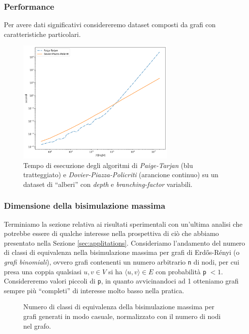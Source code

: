 \subsubsection{Performance}
Per avere dati significativi considereremo dataset composti da grafi con caratteristiche particolari.
\begin{figure}
    \centering
    \includegraphics[width=0.7\textwidth]{./sezione3/experimental_results/plots/tree.png}
    \caption{Tempo di esecuzione degli algoritmi di \emph{Paige-Tarjan} (blu tratteggiato) e \emph{Dovier-Piazza-Policriti} (arancione continuo) su un dataset di ``alberi'' con \emph{depth} e \emph{branching-factor} variabili.}
    \label{fig:tree_exp_result}
\end{figure}

\subsubsection{Dimensione della bisimulazione massima}
Terminiamo la sezione relativa ai risultati sperimentali con un'ultima analisi che potrebbe essere di qualche interesse nella prospettiva di ciò che abbiamo presentato nella Sezione \ref{sec:applitations}. Consideriamo l'andamento del numero di classi di equivalenza nella bisimulazione massima per grafi di Erdős-Rényi (o \emph{grafi binomiali}), ovvero grafi contenenti un numero arbitrario \verb|n| di nodi, per cui presa una coppia qualsiasi $u,v \in V$ si ha $\langle u,v\rangle \in E$ con probabilità \verb|p| $< 1$.
Considereremo valori piccoli di \verb|p|, in quanto avvicinandoci ad 1 otteniamo grafi sempre più ``completi'' di interesse molto basso nella pratica.

\begin{figure}
    \caption{Numero di classi di equivalenza della bisimulazione massima per grafi generati in modo casuale, normalizzato con il numero di nodi nel grafo.}
    \label{fig:bisi_size}
\end{figure}

